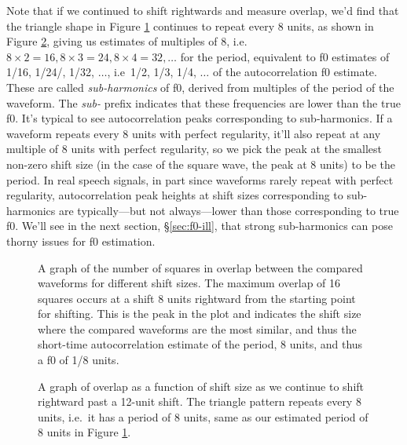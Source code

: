 \documentclass[12pt]{article}
\begin{document}
Note that if we continued to shift rightwards and measure overlap,
we'd find that the triangle shape in Figure \ref{fig:triangle}
continues to repeat every 8 units, as shown in Figure \ref{fig:tooth},
giving us estimates of multiples of 8, i.e.\ $8 \times 2 = 16, 8
\times 3 = 24, 8 \times 4 = 32, \ldots$ for the period, equivalent to
f0 estimates of 1/16, 1/24/, 1/32, $\ldots$, i.e\ 1/2, 1/3, 1/4,
$\ldots$ of the autocorrelation f0 estimate. These are called
\textit{sub-harmonics} of f0, derived from multiples of the period of
the waveform. The \textit{sub-} prefix indicates that these
frequencies are lower than the true f0. It's typical to see
autocorrelation peaks corresponding to sub-harmonics. If a waveform
repeats every 8 units with perfect regularity, it'll also repeat at
any multiple of 8 units with perfect regularity, so we pick the peak
at the smallest non-zero shift size (in the case of the square wave,
the peak at 8 units) to be the period. In real speech
signals, in part since waveforms rarely repeat with perfect regularity,
autocorrelation peak heights at shift sizes corresponding to sub-harmonics are typically---but
not always---lower than those corresponding to true f0.  We'll see in
the next section, \S\ref{sec:f0-ill}, that strong sub-harmonics can
pose thorny issues for f0 estimation.

\begin{figure}
  \centering
  
  \caption{A graph of the number of squares in overlap between the
    compared waveforms for different shift
    sizes. The maximum overlap of 16 squares occurs at a shift 8 units
  rightward from the starting point for shifting. This is the peak in
  the plot and indicates the shift size where the compared waveforms
  are the most similar, and thus the short-time autocorrelation
  estimate of the period, 8 units, and thus a f0 of 1/8 units.}
  \label{fig:triangle}
\end{figure}

\begin{figure}
  \centering
  \caption{A graph of overlap as a function of shift size as we
    continue to shift rightward past a 12-unit shift. The triangle
    pattern repeats every 8 units, i.e.\ it has a period of 8 units,
    same as our estimated period of 8 units in Figure
    \ref{fig:triangle}.}
  \label{fig:tooth}
\end{figure}

\clearpage
\end{document}

